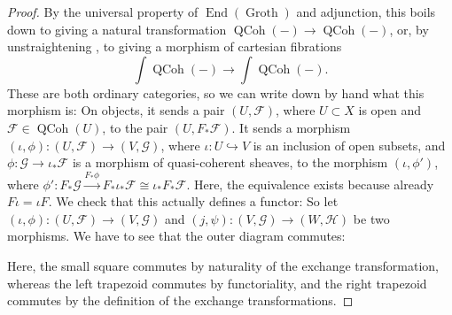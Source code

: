 \documentclass{article}
\theoremstyle{definition}
\theoremstyle{definition}
\theoremstyle{definition}
\theoremstyle{plain}
\theoremstyle{plain}
\theoremstyle{plain}
\theoremstyle{plain}
\theoremstyle{plain}
\theoremstyle{plain}
\theoremstyle{plain}
\theoremstyle{plain}
\theoremstyle{remark}
\theoremstyle{remark}
\theoremstyle{plain}
\theoremstyle{plain}
\theoremstyle{plain}
\theoremstyle{plain}
\theoremstyle{plain}
\newcommand{\QCoh}[1]{\operatorname{QCoh}(#1)}
\newcommand{\End}[1]{\operatorname{End}(#1)}
\newcommand{\Cat}[1]{\mathcal{#1}}
\newcommand{\Groth}{\operatorname{Groth}}
\begin{document}
\begin{proof}
    By the universal property of $\End{\Groth}$ and adjunction, this boils down to giving a natural transformation
    $\QCoh{-} \to \QCoh{-}$,
    or, by unstraightening \cite[§3.2]{highertopoi}, to giving a morphism of cartesian fibrations
    \begin{equation*}
        \int \QCoh{-} \to \int \QCoh{-}.
    \end{equation*}
    These are both ordinary categories, so we can write down by hand what this morphism is:
    On objects, it sends a pair $(U, \Cat F)$, where $U \subset X$ is open and $\Cat F \in \QCoh{U}$,
    to the pair $(U, F_* \Cat F)$.
    It sends a morphism $(\iota, \phi) \colon (U, \Cat F) \to (V, \Cat G)$,
    where $\iota \colon U \hookrightarrow V$ is an inclusion of open subsets, 
    and $\phi \colon \Cat G \to \iota_* \Cat F$ is a morphism of quasi-coherent sheaves,
    to the morphism $(\iota, \phi')$,
    where $\phi' \colon F_* \Cat G \xrightarrow{F_* \phi} F_* \iota_* \Cat F \cong \iota_* F_* \Cat F$.
    Here, the equivalence exists because already $F\iota = \iota F$.
    We check that this actually defines a functor:
    So let $(\iota, \phi) \colon (U, \Cat F) \to (V, \Cat G)$
    and $(j, \psi) \colon (V, \Cat G) \to (W, \Cat H)$ be two morphisms.
    We have to see that the outer diagram commutes:
    \begin{center}
    \end{center}
    Here, the small square commutes by naturality of the exchange transformation,
    whereas the left trapezoid commutes by functoriality, and the right trapezoid 
    commutes by the definition of the exchange transformations.


\end{proof}
\end{document}
